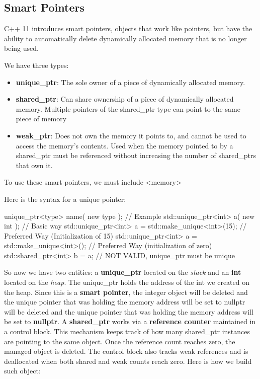 \documentclass{report}
\begin{document}
    \subsection{Smart Pointers}
    \bigbreak \noindent 
    \begin{concept}
 C++ 11 introduces smart pointers, objects that work like pointers, but have the ability to automatically delete dynamically allocated memory that is no longer being used.
	\end{concept}
    \bigbreak \noindent 
    We have three types:
    \begin{itemize}
        \item \textbf{unique\_ptr}: The sole owner of a piece of dynamically allocated memory. 
        \item \textbf{shared\_ptr}: Can share ownership of a piece of dynamically allocated memory. Multiple pointers of the shared\_ptr type can point to the same piece of memory
        \item \textbf{weak\_ptr}: Does not own the memory it points to, and cannot be used to access the memory's contents. Used when the memory pointed to by a shared\_ptr must be referenced without increasing the number of shared\_ptrs that own it.
    \end{itemize}
    \bigbreak \noindent 
    \begin{notebox}
			To use these smart pointers, we must include <memory>
		\end{notebox}

    \pagebreak \bigbreak \noindent 
    Here is the syntax for a unique pointer:
    \bigbreak \noindent 
    
    \begin{cppcode}
unique_ptr<type> name( new type );
// Example
std::unique_ptr<int> a( new int ); // Basic way 
std::unique_ptr<int> a = std::make_unique<int>(15); // Preferred Way (Initialization of 15)
std::unique_ptr<int> a = std::make_unique<int>(); // Preferred Way (initialization of zero)
std::shared_ptr<int> b = a; //  NOT VALID, unique_ptr must be unique
    \end{cppcode}
    
    \bigbreak \noindent 
    So now we have two entities: a \textbf{unique\_ptr} located on the \textit{stack} and an \textbf{int} located on the \textit{heap}. The unique\_ptr holds the address of the int we created on the heap. Since this is a \textbf{smart pointer}, the integer object will be deleted and the unique pointer that was holding the memory address will be set to nullptr will be deleted and the unique pointer that was holding the memory address will be set to \textbf{nullptr}.
    \bigbreak \noindent 
    A \textbf{shared\_ptr} works via a \textbf{reference counter} maintained in a control block. This mechanism keeps track of how many shared\_ptr instances are pointing to the same object. Once the reference count reaches zero, the managed object is deleted. The control block also tracks weak references and is deallocated when both shared and weak counts reach zero. Here is how we build such object:
    \bigbreak \noindent 
    
\end{document}
